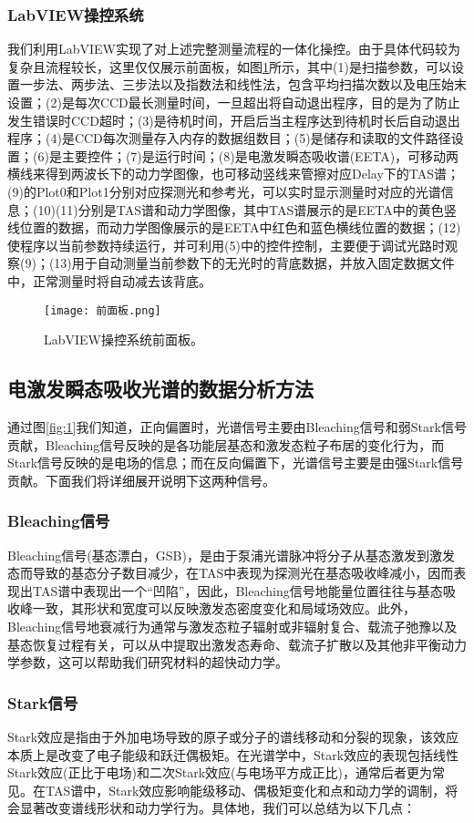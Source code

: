 \subsubsection{LabVIEW操控系统}
我们利用LabVIEW实现了对上述完整测量流程的一体化操控。由于具体代码较为复杂且流程较长，这里仅仅展示前面板，如图\ref{fig:qmb}所示，其中(1)是扫描参数，可以设置一步法、两步法、三步法以及指数法和线性法，包含平均扫描次数以及电压始末设置；(2)是每次CCD最长测量时间，一旦超出将自动退出程序，目的是为了防止发生错误时CCD超时；(3)是待机时间，开启后当主程序达到待机时长后自动退出程序；(4)是CCD每次测量存入内存的数据组数目；(5)是储存和读取的文件路径设置；(6)是主要控件；(7)是运行时间；(8)是电激发瞬态吸收谱(EETA)，可移动两横线来得到两波长下的动力学图像，也可移动竖线来管擦对应Delay下的TAS谱；(9)的Plot0和Plot1分别对应探测光和参考光，可以实时显示测量时对应的光谱信息；(10)(11)分别是TAS谱和动力学图像，其中TAS谱展示的是EETA中的黄色竖线位置的数据，而动力学图像展示的是EETA中红色和蓝色横线位置的数据；(12)使程序以当前参数持续运行，并可利用(5)中的控件控制，主要便于调试光路时观察(9)；(13)用于自动测量当前参数下的无光时的背底数据，并放入固定数据文件中，正常测量时将自动减去该背底。
\begin{figure}[ht]
	\centering
	\texttt{[image: 前面板.png]}
	\caption{LabVIEW操控系统前面板。}
	\label{fig:qmb}
\end{figure}
\subsection{电激发瞬态吸收光谱的数据分析方法}\label{2.3}
通过图\ref{fig:1}我们知道，正向偏置时，光谱信号主要由Bleaching信号和弱Stark信号贡献，Bleaching信号反映的是各功能层基态和激发态粒子布居的变化行为，而Stark信号反映的是电场的信息；而在反向偏置下，光谱信号主要是由强Stark信号贡献。下面我们将详细展开说明下这两种信号。
\subsubsection{Bleaching信号}
Bleaching信号(基态漂白，GSB)，是由于泵浦光谱脉冲将分子从基态激发到激发态而导致的基态分子数目减少，在TAS中表现为探测光在基态吸收峰减小，因而表现出TAS谱中表现出一个“凹陷”，因此，Bleaching信号地能量位置往往与基态吸收峰一致，其形状和宽度可以反映激发态密度变化和局域场效应。此外，Bleaching信号地衰减行为通常与激发态粒子辐射或非辐射复合、载流子弛豫以及基态恢复过程有关，可以从中提取出激发态寿命、载流子扩散以及其他非平衡动力学参数，这可以帮助我们研究材料的超快动力学。
\subsubsection{Stark信号}
Stark效应是指由于外加电场导致的原子或分子的谱线移动和分裂的现象，该效应本质上是改变了电子能级和跃迁偶极矩。在光谱学中，Stark效应的表现包括线性Stark效应(正比于电场)和二次Stark效应(与电场平方成正比)，通常后者更为常见。在TAS谱中，Stark效应影响能级移动、偶极矩变化和点和动力学的调制，将会显著改变谱线形状和动力学行为。具体地，我们可以总结为以下几点：
